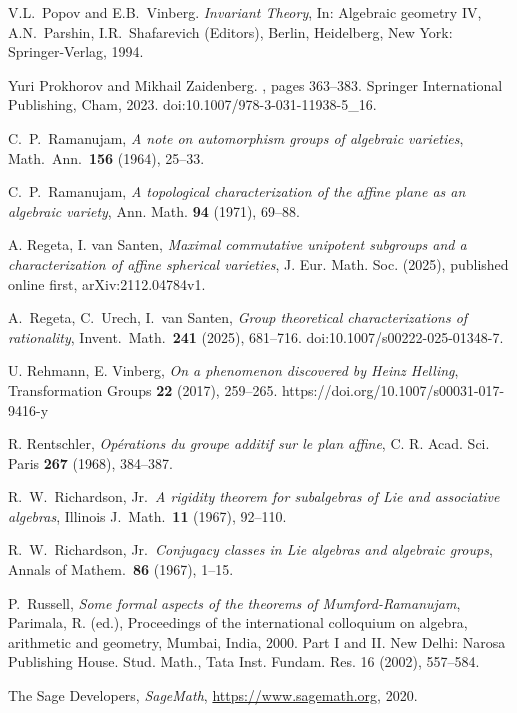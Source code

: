 V.L.~Popov and E.B.~Vinberg. \emph{Invariant Theory}, In: Algebraic
geometry IV,  A.N.~Parshin, I.R.~Shafarevich (Editors), Berlin,
Heidelberg, New York: Springer-Verlag, 1994.

Yuri Prokhorov and Mikhail Zaidenberg.
, pages 363--383.
\newblock Springer International Publishing, Cham, 2023.
\newblock doi:10.1007/978-3-031-11938-5\_16.

C.~P.~Ramanujam, \emph{A note on automorphism groups of algebraic varieties},
      Math.\ Ann.\ \textbf{156} (1964), 25--33.

C.~P.~Ramanujam,  \emph{A topological characterization
of the affine plane as an algebraic variety},
Ann. Math. \textbf{94} (1971), 69--88.

A. Regeta, I. van Santen, \emph{Maximal commutative unipotent subgroups and a characterization of affine spherical varieties}, J. Eur. Math. Soc. (2025), published online first, arXiv:2112.04784v1.

A.~Regeta, C.~Urech, I.~van Santen,
\emph{Group theoretical characterizations of rationality},
Invent.\ Math.\ \textbf{241} (2025), 681--716.
doi:10.1007/s00222-025-01348-7.

U. Rehmann, E. Vinberg, \emph{On a phenomenon discovered by Heinz Helling}, Transformation Groups \textbf{22} (2017), 259--265. https://doi.org/10.1007/s00031-017-9416-y

R. Rentschler, \emph{Op\'erations du groupe additif sur le plan affine}, C. R. Acad. Sci. Paris \textbf{267} (1968), 384--387.

R.~W.~Richardson, Jr.\ \emph{A rigidity theorem for subalgebras of Lie and
associative algebras}, Illinois J.\ Math.\ \textbf{11} (1967), 92--110.

R.~W.~Richardson, Jr.\ \emph{Conjugacy classes in Lie algebras
and algebraic groups}, Annals of Mathem.\ \textbf{86} (1967), 1--15.

P.~Russell,
\emph{Some formal aspects of the theorems of Mumford-Ramanujam},
Parimala, R. (ed.), Proceedings of the international colloquium on algebra, arithmetic and geometry,
Mumbai, India, 2000. Part I and II. New Delhi: Narosa Publishing House. Stud. Math.,
Tata Inst. Fundam. Res. 16  (2002), 557--584.

The Sage Developers, \emph{SageMath}, \url{https://www.sagemath.org}, 2020.

